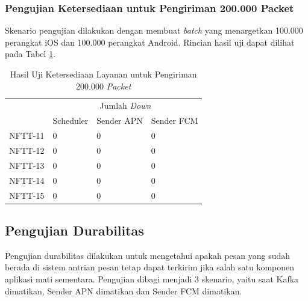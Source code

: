 \subsubsection{Pengujian Ketersediaan untuk Pengiriman 200.000 Packet}
\par Skenario pengujian dilakukan dengan membuat \textit{batch} yang menargetkan 100.000 perangkat iOS dan 100.000 perangkat Android. Rincian hasil uji dapat dilihat pada Tabel \ref{t:ketersediaan-200k}.
\begin{longtable}{|p{1.5cm}|p{2cm}|p{2cm}|p{2cm}|}
	\caption{Hasil Uji Ketersediaan Layanan untuk Pengiriman 200.000 \textit{Packet}} \label{t:ketersediaan-200k} \\ \hline
	\rowcolor{lightgray} & \multicolumn{3}{c|}{Jumlah \textit{Down}} \\ \hhline{~|*3{-}|}
	\rowcolor{lightgray} \multirow{-2}{*}{Kode}  & Scheduler & Sender APN & Sender FCM \\ \hline
	NFTT-11 & 0 & 0 & 0 \\ \hline
	NFTT-12 & 0 & 0 & 0 \\ \hline
	NFTT-13 & 0 & 0 & 0 \\ \hline
	NFTT-14 & 0 & 0 & 0 \\ \hline
	NFTT-15 & 0 & 0 & 0 \\ \hline
\end{longtable}

\subsection{Pengujian Durabilitas}
\par Pengujian durabilitas dilakukan untuk mengetahui apakah pesan yang sudah berada di sistem antrian pesan tetap dapat terkirim jika salah satu komponen aplikasi mati sementara. Pengujian dibagi menjadi 3 skenario, yaitu saat Kafka dimatikan, Sender APN dimatikan dan Sender FCM dimatikan.

